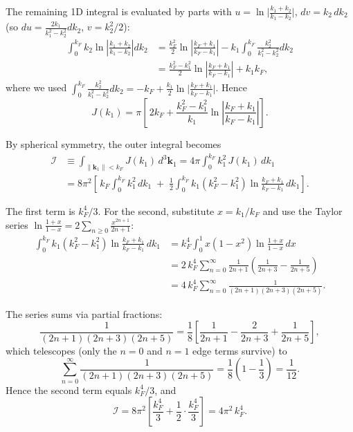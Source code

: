 \documentclass[a4paper,11pt]{article}
\begin{document}
The remaining 1D integral is evaluated by parts with $u=\ln\!\big|\frac{k_1+k_2}{k_1-k_2}\big|$, $dv = k_2\, dk_2$ (so $du = \frac{2k_1}{k_1^2-k_2^2}dk_2$, $v = k_2^2/2$):
\begin{align}
  \int_0^{k_F}\!\!k_2\ln\!\left|\frac{k_1+k_2}{k_1-k_2}\right| dk_2
  &= \frac{k_F^2}{2}\ln\!\left|\frac{k_F+k_1}{k_F-k_1}\right| - k_1\!\int_0^{k_F}\!\frac{k_2^2}{k_1^2-k_2^2}dk_2 \nonumber\\
  &= \frac{k_F^2-k_1^2}{2}\ln\!\left|\frac{k_F+k_1}{k_F-k_1}\right| + k_1 k_F,
\end{align}
where we used $\int_0^{k_F}\frac{k_2^2}{k_1^2-k_2^2}dk_2 = -k_F + \frac{k_1}{2}\ln\!\big|\frac{k_F+k_1}{k_F-k_1}\big|$.  Hence
\begin{equation}
  J(k_1) = \pi\!\left[\,2 k_F + \frac{k_F^2 - k_1^2}{k_1}\ln\!\left|\frac{k_F+k_1}{k_F-k_1}\right|\right].
\end{equation}

By spherical symmetry, the outer integral becomes
\begin{align}
  \mathcal{I} &\equiv \int_{\|\mathbf{k}_1\|<k_F}\!\!J(k_1)\, d^3\mathbf{k}_1 = 4\pi\!\int_0^{k_F}\!\! k_1^2\, J(k_1)\, dk_1 \nonumber\\
  &= 8\pi^2\!\left[\,k_F\!\int_0^{k_F}\!\! k_1^2\, dk_1 \;+\; \tfrac{1}{2}\!\int_0^{k_F}\!\! k_1(k_F^2 - k_1^2)\ln\!\frac{k_F+k_1}{k_F-k_1}\, dk_1\right].
\end{align}

The first term is $k_F^4/3$.  For the second, substitute $x = k_1/k_F$ and use the Taylor series $\ln\frac{1+x}{1-x} = 2\sum_{n\ge 0}\frac{x^{2n+1}}{2n+1}$:
\begin{align}
  \int_0^{k_F}\!\! k_1(k_F^2 - k_1^2)\ln\!\frac{k_F+k_1}{k_F-k_1}\, dk_1
  &= k_F^4\!\int_0^1\!\! x(1-x^2)\ln\!\frac{1+x}{1-x}\, dx \nonumber\\
  &= 2\, k_F^4 \sum_{n=0}^\infty \frac{1}{2n+1}\!\left(\frac{1}{2n+3}-\frac{1}{2n+5}\right) \nonumber\\
  &= 4\, k_F^4\sum_{n=0}^\infty \frac{1}{(2n+1)(2n+3)(2n+5)}.
\end{align}

The series sums via partial fractions:
\[
  \frac{1}{(2n+1)(2n+3)(2n+5)} = \frac{1}{8}\!\left[\frac{1}{2n+1} - \frac{2}{2n+3} + \frac{1}{2n+5}\right],
\]
which telescopes (only the $n=0$ and $n=1$ edge terms survive) to
\[
  \sum_{n=0}^\infty\frac{1}{(2n+1)(2n+3)(2n+5)} = \frac{1}{8}\!\left(1 - \frac{1}{3}\right) = \frac{1}{12}.
\]
Hence the second term equals $k_F^4/3$, and
\begin{equation}
  \mathcal{I} = 8\pi^2\!\left[\frac{k_F^4}{3} + \frac{1}{2}\cdot\frac{k_F^4}{3}\right] = 4\pi^2\, k_F^4.
\end{equation}
\end{document}
